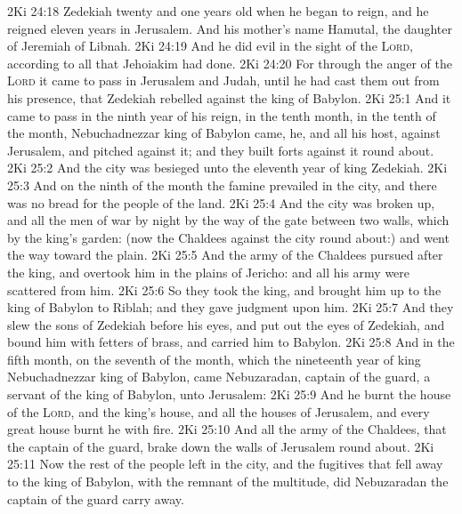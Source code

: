 \vs 2Ki 24:18 Zedekiah  twenty and one years old when he began to reign, and he reigned eleven years in Jerusalem. And his mother's name  Hamutal, the daughter of Jeremiah of Libnah.
\vs 2Ki 24:19 And he did  evil in the sight of the \textsc{Lord}, according to all that Jehoiakim had done.
\vs 2Ki 24:20 For through the anger of the \textsc{Lord} it came to pass in Jerusalem and Judah, until he had cast them out from his presence, that Zedekiah rebelled against the king of Babylon.
\vs 2Ki 25:1 And it came to pass in the ninth year of his reign, in the tenth month, in the tenth  of the month,  Nebuchadnezzar king of Babylon came, he, and all his host, against Jerusalem, and pitched against it; and they built forts against it round about.
\vs 2Ki 25:2 And the city was besieged unto the eleventh year of king Zedekiah.
\vs 2Ki 25:3 And on the ninth  of the  month the famine prevailed in the city, and there was no bread for the people of the land.
\vs 2Ki 25:4 And the city was broken up, and all the men of war  by night by the way of the gate between two walls, which  by the king's garden: (now the Chaldees  against the city round about:) and  went the way toward the plain.
\vs 2Ki 25:5 And the army of the Chaldees pursued after the king, and overtook him in the plains of Jericho: and all his army were scattered from him.
\vs 2Ki 25:6 So they took the king, and brought him up to the king of Babylon to Riblah; and they gave judgment upon him.
\vs 2Ki 25:7 And they slew the sons of Zedekiah before his eyes, and put out the eyes of Zedekiah, and bound him with fetters of brass, and carried him to Babylon.
\vs 2Ki 25:8 And in the fifth month, on the seventh  of the month, which  the nineteenth year of king Nebuchadnezzar king of Babylon, came Nebuzaradan, captain of the guard, a servant of the king of Babylon, unto Jerusalem:
\vs 2Ki 25:9 And he burnt the house of the \textsc{Lord}, and the king's house, and all the houses of Jerusalem, and every great  house burnt he with fire.
\vs 2Ki 25:10 And all the army of the Chaldees, that  the captain of the guard, brake down the walls of Jerusalem round about.
\vs 2Ki 25:11 Now the rest of the people  left in the city, and the fugitives that fell away to the king of Babylon, with the remnant of the multitude, did Nebuzaradan the captain of the guard carry away.
